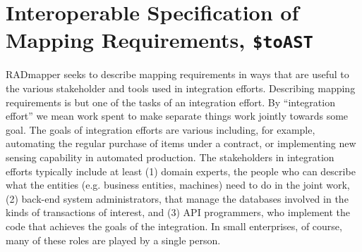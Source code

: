 \documentclass[10pt,letterpaper]{article} %
\newcommand{\stt}[1]{\texttt{#1}} %
\begin{document}
\section{Interoperable Specification of Mapping Requirements, \stt{\$toAST}}
\label{sec:toAST}

RADmapper seeks to describe mapping requirements in ways that are useful to the various stakeholder and tools used in integration efforts.
Describing mapping requirements is but one of the tasks of an integration effort.
By ``integration effort'' we mean work spent to make separate things work jointly towards some goal.
The goals of integration efforts are various including, for example, automating the regular purchase of items under a contract, or implementing new sensing capability in automated production.
The stakeholders in integration efforts typically include at least
(1) domain experts, the people who can describe what the entities (e.g. business entities, machines) need to do in the joint work,
(2) back-end system administrators, that manage the databases involved in the kinds of transactions of interest, and
(3) API programmers, who implement the code that achieves the goals of the integration.
In small enterprises, of course, many of these roles are played by a single person.

%
\end{document}
